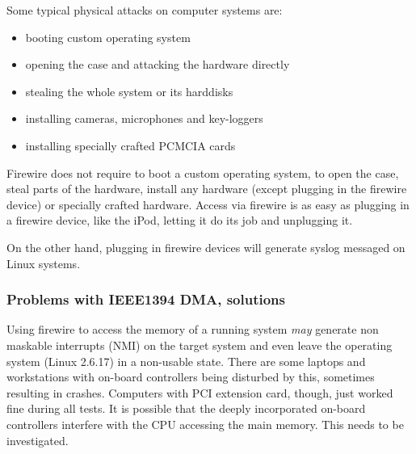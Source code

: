Some typical physical attacks on computer systems are:

\begin{itemize}

	\item booting custom operating system

	\item opening the case and attacking the hardware directly

	\item stealing the whole system or its harddisks

	\item installing cameras, microphones and key-loggers

	\item installing specially crafted PCMCIA cards

\end{itemize}

Firewire does not require to boot a custom operating system, to open the case,
steal parts of the hardware, install any hardware (except plugging in the
firewire device) or specially crafted hardware. Access via firewire is as easy
as plugging in a firewire device, like the iPod, letting it do its job and
unplugging it.


On the other hand, plugging in firewire devices will generate syslog messaged on
Linux systems.

\pagebreak

\subsubsection{Problems with IEEE1394 DMA, solutions}

Using firewire to access the memory of a running system \emph{may} generate non
maskable interrupts (NMI) on the target system and even leave the operating
system (Linux 2.6.17) in a non-usable state. There are some laptops and
workstations with on-board controllers being disturbed by this, sometimes
resulting in crashes. Computers with PCI extension card, though, just worked
fine during all tests. It is possible that the deeply incorporated on-board
controllers interfere with the CPU accessing the main memory. This needs to be
investigated.

